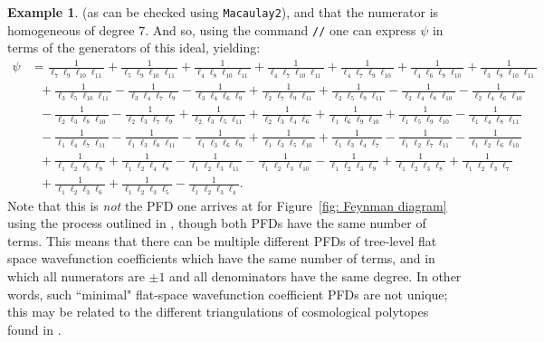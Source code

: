 \documentclass [a4paper,reqno, 11pt]{amsart}
\theoremstyle{plain}
\theoremstyle{plain}
\theoremstyle{plain}
\theoremstyle{plain}
\theoremstyle{definition}
\theoremstyle{definition}
\newtheorem{example}[theorem]{Example}
\theoremstyle{definition}
\theoremstyle{definition}
\theoremstyle{definition}
\theoremstyle{definition}
\begin{document}
\begin{example}
(as can be checked using \texttt{Macaulay2}), and that the numerator is homogeneous of degree $7$. And so, using the command \texttt{//} one can express $\psi$ in terms of the generators of this ideal, yielding:
\begin{equation*}
\begin{split}
\psi &=\frac{1}{\ell_7\ell_9\ell_{10}\ell_{11}}+\frac{1}{\ell_5\ell_9\ell_{10}\ell_{11}}+\frac{1}{\ell_4\ell_8\ell_{10}\ell_{11}}+\frac{1}{\ell_4\ell_7\ell_{10}\ell_{11}}+\frac{1}{\ell_{4}\ell_{7}\ell_{9}\ell_{10}}+\frac{1}{\ell_{4}\ell_{6}\ell_{9}\ell_{10}}+\frac{1}{\ell_{3}\ell_{8}\ell_{10}\ell_{11}}\\& \ \ \ +\frac{1}{\ell_{3}\ell_{5}\ell_{10}\ell_{11}}-\frac{1}{\ell_{3}\ell_{4}\ell_{7}\ell_{9}}-\frac{1}{\ell_{3}\ell_{4}\ell_{6}\ell_{9}}+\frac{1}{\ell_{2}\ell_{7}\ell_{9}\ell_{11}}+\frac{1}{\ell_{2}\ell_{5}\ell_{9}\ell_{11}}-\frac{1}{\ell_{2}\ell_{4}\ell_{8}\ell_{10}}-\frac{1}{\ell_{2}\ell_{4}\ell_{6}\ell_{10}}\\& \ \ \ -\frac{1}{\ell_{2}\ell_{3}\ell_{8}\ell_{10}}-\frac{1}{\ell_{2}\ell_{3}\ell_{7}\ell_{9}}+\frac{1}{\ell_{2}\ell_{3}\ell_{5}\ell_{11}}+\frac{1}{\ell_{2}\ell_{3}\ell_{4}\ell_{6}}+\frac{1}{\ell_{1}\ell_{6}\ell_{9}\ell_{10}}+\frac{1}{\ell_{1}\ell_{5}\ell_{9}\ell_{10}}-\frac{1}{\ell_{1}\ell_{4}\ell_{8}\ell_{11}}\\& \ \ \ -\frac{1}{\ell_{1}\ell_{4}\ell_{7}\ell_{11}}-\frac{1}{\ell_{1}\ell_{3}\ell_{8}\ell_{11}}-\frac{1}{\ell_{1}\ell_{3}\ell_{6}\ell_{9}}+\frac{1}{\ell_{1}\ell_{3}\ell_{5}\ell_{10}}+\frac{1}{\ell_{1}\ell_{3}\ell_{4}\ell_{7}}-\frac{1}{\ell_{1}\ell_{2}\ell_{7}\ell_{11}}-\frac{1}{\ell_{1}\ell_{2}\ell_{6}\ell_{10}}\\& \ \ \ +\frac{1}{\ell_{1}\ell_{2}\ell_{5}\ell_{9}}+\frac{1}{\ell_{1}\ell_{2}\ell_{4}\ell_{8}}-\frac{1}{\ell_{1}\ell_{2}\ell_{3}\ell_{11}}-\frac{1}{\ell_{1}\ell_{2}\ell_{3}\ell_{10}}-\frac{1}{\ell_{1}\ell_{2}\ell_{3}\ell_{9}}+\frac{1}{\ell_{1}\ell_{2}\ell_{3}\ell_{8}}+\frac{1}{\ell_{1}\ell_{2}\ell_{3}\ell_{7}}\\& \ \ \ +\frac{1}{\ell_{1}\ell_{2}\ell_{3}\ell_{6}}+\frac{1}{\ell_{1}\ell_{2}\ell_{3}\ell_{5}}-\frac{1}{\ell_{1}\ell_{2}\ell_{3}\ell_{4}}.
\end{split}
\end{equation*}
Note that this is \emph{not} the PFD one arrives at for Figure~\ref{fig: Feynman diagram} using the process outlined in \cite{Dun}, though both PFDs have the same number of terms. This means that there can be multiple different PFDs of tree-level flat space wavefunction coefficients which have the same number of terms, and in which all numerators are $\pm1$ and all denominators have the same degree. In other words, such ``minimal" flat-space wavefunction coefficient PFDs are not unique; this may be related to the different triangulations of cosmological polytopes found in \cite{BDFJ}.


\end{example}
\end{document}

